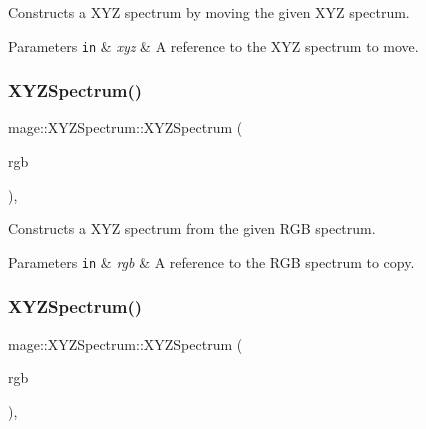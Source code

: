 Constructs a X\+YZ spectrum by moving the given X\+YZ spectrum.


\begin{DoxyParams}[1]{Parameters}
\mbox{\tt in}  & {\em xyz} & A reference to the X\+YZ spectrum to move. \\
\hline
\end{DoxyParams}
\hypertarget{structmage_1_1_x_y_z_spectrum_a7498fec029d8e76e7b666116ac6f2cc8}{}\label{structmage_1_1_x_y_z_spectrum_a7498fec029d8e76e7b666116ac6f2cc8} 
\subsubsection{\texorpdfstring{X\+Y\+Z\+Spectrum()}{XYZSpectrum()}\hspace{0.1cm}{\footnotesize\ttfamily [5/8]}}
{\footnotesize\ttfamily mage\+::\+X\+Y\+Z\+Spectrum\+::\+X\+Y\+Z\+Spectrum (\begin{DoxyParamCaption}\item[{const \hyperlink{structmage_1_1_r_g_b_spectrum}{R\+G\+B\+Spectrum} \&}]{rgb }\end{DoxyParamCaption})\hspace{0.3cm}{\ttfamily [explicit]}, {\ttfamily [noexcept]}}

Constructs a X\+YZ spectrum from the given R\+GB spectrum.


\begin{DoxyParams}[1]{Parameters}
\mbox{\tt in}  & {\em rgb} & A reference to the R\+GB spectrum to copy. \\
\hline
\end{DoxyParams}
\hypertarget{structmage_1_1_x_y_z_spectrum_aeea123e6753c755aa594552bad15450b}{}\label{structmage_1_1_x_y_z_spectrum_aeea123e6753c755aa594552bad15450b} 
\subsubsection{\texorpdfstring{X\+Y\+Z\+Spectrum()}{XYZSpectrum()}\hspace{0.1cm}{\footnotesize\ttfamily [6/8]}}
{\footnotesize\ttfamily mage\+::\+X\+Y\+Z\+Spectrum\+::\+X\+Y\+Z\+Spectrum (\begin{DoxyParamCaption}\item[{\hyperlink{structmage_1_1_r_g_b_spectrum}{R\+G\+B\+Spectrum} \&\&}]{rgb }\end{DoxyParamCaption})\hspace{0.3cm}{\ttfamily [explicit]}, {\ttfamily [noexcept]}}

